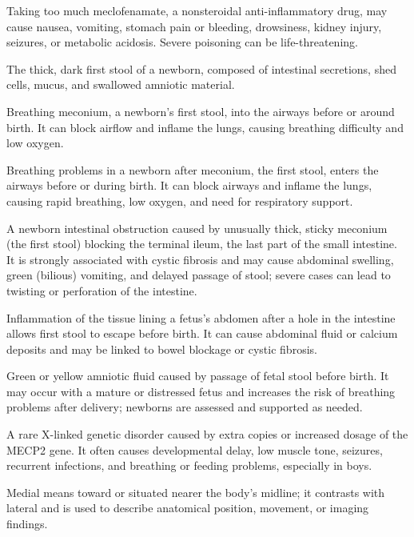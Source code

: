  Taking too much meclofenamate, a nonsteroidal anti-inflammatory drug, may cause nausea, vomiting, stomach pain or bleeding, drowsiness, kidney injury, seizures, or metabolic acidosis. Severe poisoning can be life-threatening.

 The thick, dark first stool of a newborn, composed of intestinal secretions, shed cells, mucus, and swallowed amniotic material.

 Breathing meconium, a newborn's first stool, into the airways before or around birth. It can block airflow and inflame the lungs, causing breathing difficulty and low oxygen.

 Breathing problems in a newborn after meconium, the first stool, enters the airways before or during birth. It can block airways and inflame the lungs, causing rapid breathing, low oxygen, and need for respiratory support.

 A newborn intestinal obstruction caused by unusually thick, sticky meconium (the first stool) blocking the terminal ileum, the last part of the small intestine. It is strongly associated with cystic fibrosis and may cause abdominal swelling, green (bilious) vomiting, and delayed passage of stool; severe cases can lead to twisting or perforation of the intestine.

 Inflammation of the tissue lining a fetus’s abdomen after a hole in the intestine allows first stool to escape before birth. It can cause abdominal fluid or calcium deposits and may be linked to bowel blockage or cystic fibrosis.

 Green or yellow amniotic fluid caused by passage of fetal stool before birth. It may occur with a mature or distressed fetus and increases the risk of breathing problems after delivery; newborns are assessed and supported as needed.

 A rare X-linked genetic disorder caused by extra copies or increased dosage of the MECP2 gene. It often causes developmental delay, low muscle tone, seizures, recurrent infections, and breathing or feeding problems, especially in boys.

 Medial means toward or situated nearer the body's midline; it contrasts with lateral and is used to describe anatomical position, movement, or imaging findings.

